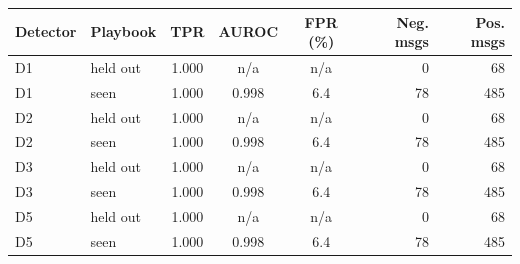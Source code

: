 \begin{tabular}{llcccrr}
\toprule
Detector & Playbook & TPR & AUROC & FPR (\%) & Neg. msgs & Pos. msgs \\
\midrule
D1 & held out & 1.000 & n/a & n/a & 0 & 68 \\
D1 & seen & 1.000 & 0.998 & 6.4 & 78 & 485 \\
D2 & held out & 1.000 & n/a & n/a & 0 & 68 \\
D2 & seen & 1.000 & 0.998 & 6.4 & 78 & 485 \\
D3 & held out & 1.000 & n/a & n/a & 0 & 68 \\
D3 & seen & 1.000 & 0.998 & 6.4 & 78 & 485 \\
D5 & held out & 1.000 & n/a & n/a & 0 & 68 \\
D5 & seen & 1.000 & 0.998 & 6.4 & 78 & 485 \\
\bottomrule
\end{tabular}
